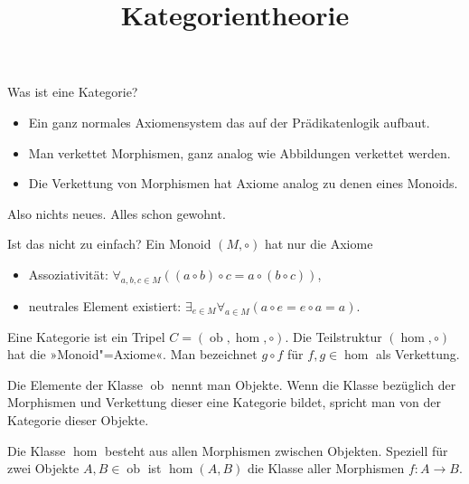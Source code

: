 \documentclass{beamer}
\title{Kategorientheorie}
\date{}
\newcommand{\ob}{\operatorname{ob}}
\begin{document}
\begin{frame}
\maketitle
\end{frame}

\begin{frame}
Was ist eine Kategorie?
\end{frame}

\begin{frame}
\begin{itemize}
\item Ein ganz normales Axiomensystem das auf der Prädikatenlogik aufbaut.
\item Man verkettet Morphismen, ganz analog wie Abbildungen
  verkettet werden.
\item Die Verkettung von Morphismen hat Axiome analog zu denen
  eines Monoids.
\end{itemize}
\end{frame}

\begin{frame}
Also nichts neues. Alles schon gewohnt.
\end{frame}

\begin{frame}
Ist das nicht zu einfach? Ein Monoid $(M,\circ)$ hat nur die Axiome
\begin{itemize}
\item Assoziativität: $\forall_{a,b,c{\in}M}((a\circ b)\circ c = a\circ (b\circ c))$,
\item neutrales Element existiert: $\exists_{e\in M}\forall_{a\in M}(a\circ e = e\circ a = a)$.
\end{itemize}
\end{frame}

\begin{frame}
Eine Kategorie ist ein Tripel $C=(\operatorname{ob},\hom,\circ)$.
Die Teilstruktur $(\hom,\circ)$ hat die »Monoid"=Axiome«.
Man bezeichnet $g\circ f$ für $f,g\in\hom$ als Verkettung.

\vspace{1em}
Die Elemente der Klasse $\ob$ nennt man Objekte.
Wenn die Klasse bezüglich der Morphismen und Verkettung dieser
eine Kategorie bildet, spricht man von der Kategorie dieser Objekte.
\end{frame}

\begin{frame}
Die Klasse $\hom$ besteht aus allen Morphismen zwischen Objekten.
Speziell für zwei Objekte $A,B\in\ob$ ist $\hom(A,B)$ die Klasse
aller Morphismen $f\colon A\to B$.
\end{frame}
\end{document}
